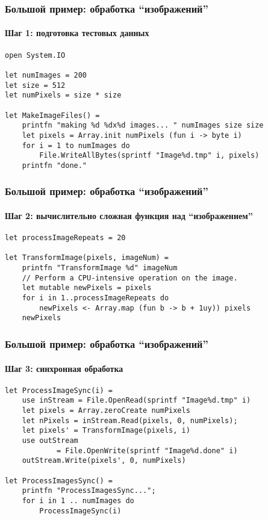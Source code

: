 \documentclass[xetex,mathserif,serif]{beamer}
\begin{document}
	\begin{frame}[fragile]
		\frametitle{Большой пример: обработка ``изображений''}
		\framesubtitle{Шаг 1: подготовка тестовых данных}
		\begin{verbatim}
open System.IO

let numImages = 200
let size = 512
let numPixels = size * size

let MakeImageFiles() =
    printfn "making %d %dx%d images... " numImages size size
    let pixels = Array.init numPixels (fun i -> byte i)
    for i = 1 to numImages do
        File.WriteAllBytes(sprintf "Image%d.tmp" i, pixels)
    printfn "done."
		\end{verbatim}
	\end{frame}

	\begin{frame}[fragile]
		\frametitle{Большой пример: обработка ``изображений''}
		\framesubtitle{Шаг 2: вычислительно сложная функция над ``изображением''}
		\begin{verbatim}
let processImageRepeats = 20

let TransformImage(pixels, imageNum) =
    printfn "TransformImage %d" imageNum
    // Perform a CPU-intensive operation on the image.
    let mutable newPixels = pixels
    for i in 1..processImageRepeats do 
        newPixels <- Array.map (fun b -> b + 1uy)) pixels
    newPixels
		\end{verbatim}
	\end{frame}

	\begin{frame}[fragile]
		\frametitle{Большой пример: обработка ``изображений''}
		\framesubtitle{Шаг 3: синхронная обработка}
		\begin{verbatim}
let ProcessImageSync(i) =
    use inStream = File.OpenRead(sprintf "Image%d.tmp" i)
    let pixels = Array.zeroCreate numPixels
    let nPixels = inStream.Read(pixels, 0, numPixels);
    let pixels' = TransformImage(pixels, i)
    use outStream 
            = File.OpenWrite(sprintf "Image%d.done" i)
    outStream.Write(pixels', 0, numPixels)

let ProcessImagesSync() =
    printfn "ProcessImagesSync...";
    for i in 1 .. numImages do
        ProcessImageSync(i)
		\end{verbatim}
	\end{frame}
\end{document}
